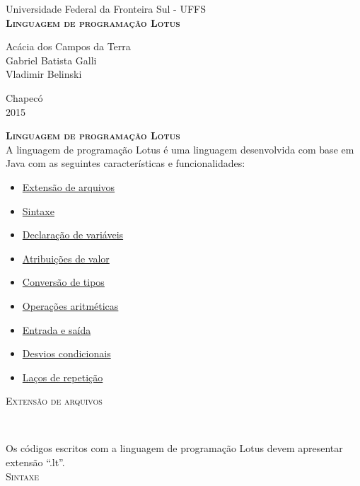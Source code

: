 \documentclass[12pt,a4paper]{article}
\begin{document}
\begin{titlepage}
\begin{center}
{\large Universidade Federal da Fronteira Sul - UFFS}\\[5.5cm]
{\bf \huge \textsc{Linguagem de programação Lotus}}\\[4.9cm]
\end{center}
{\large Acácia dos Campos da Terra}\\
{\large Gabriel Batista Galli}\\
{\large Vladimir Belinski}\\[5.8cm]
\begin{center}
{\large Chapecó}\\[0.1cm]
{\large 2015}
\end{center}
\end{titlepage}

{\bf \huge \textsc{Linguagem de programação Lotus}}\\[1.0cm]
A linguagem de programação Lotus é uma linguagem desenvolvida com base em Java com as seguintes características e funcionalidades:\\

\begin{itemize}
\item \hyperlink{label7}{Extensão de arquivos}
\item \hyperlink{label6}{Sintaxe}
\item \hyperlink{label}{Declaração de variáveis}
\item \hyperlink{label2}{Atribuições de valor}
\item \hyperlink{label8}{Conversão de tipos}
\item \hyperlink{label3}{Operações aritméticas}
\item \hyperlink{label1}{Entrada e saída}
\item \hyperlink{label4}{Desvios condicionais}
\item \hyperlink{label5}{Laços de repetição}\\[15.4cm]
\end{itemize}

\hypertarget{label7}{\Large{\textsc{Extensão de arquivos}}}\\[0.3cm]
\normalsize

Os códigos escritos com a linguagem de programação Lotus devem apresentar extensão ``.lt''.\\

\hypertarget{label6}{\Large{\textsc{Sintaxe}}}\\[0.3cm]
\normalsize
\end{document}
